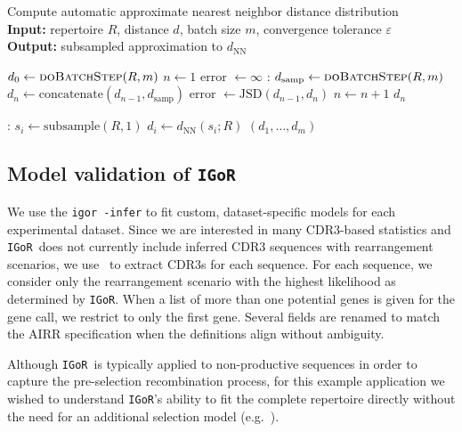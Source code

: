 \documentclass{article}
\newcommand{\igor}{\texttt{IGoR}}
\newcommand{\igblast}{\text{IgBlast}}
\begin{document}
\begin{algorithm}
    \caption{Compute automatic approximate nearest neighbor distance distribution\\
        \textbf{Input:} repertoire $R$, distance $d$, batch size $m$, convergence tolerance $\varepsilon$\\
        \textbf{Output:} subsampled approximation to $d_\text{NN}$}
    \label{alg:NNDistributionAveraging}
    \begin{algorithmic}
        \State $d_0 \gets \Call{doBatchStep}{R, m}$
        \State $n \gets 1$
        \State error $\gets \infty$
        :
        	\State $d_\text{samp} \gets \Call{doBatchStep}{R, m}$
        	\State $d_n \gets \text{concatenate}(d_{n-1}, d_\text{samp})$
        	\State error $\gets \text{JSD}(d_{n-1}, d_n)$
        	\State $n \gets n + 1$
        \EndWhile
            \Return $d_n$
    \end{algorithmic}
    \begin{algorithmic}
    :
		\State $s_i \gets \text{subsample}(R, 1)$
        \State $d_i \gets d_\text{NN}(s_i; R)$
	\EndFor
	\Return $(d_1, \dotsc, d_m)$
	\EndFunction
    \end{algorithmic}
\end{algorithm}

\subsection*{Model validation of \igor}
We use the \texttt{igor -infer} to fit custom, dataset-specific models for each experimental dataset.
Since we are interested in many CDR3-based statistics and \igor\ does not currently include inferred CDR3 sequences with rearrangement scenarios, we use \igblast\ to extract CDR3s for each sequence.
For each sequence, we consider only the rearrangement scenario with the highest likelihood as determined by \igor.
When a list of more than one potential genes is given for the gene call, we restrict to only the first gene.
Several fields are renamed to match the AIRR specification when the definitions align without ambiguity.

Although \igor\ is typically applied to non-productive sequences in order to capture the pre-selection recombination process, for this example application we wished to understand \igor's ability to fit the complete repertoire directly without the need for an additional selection model (e.g.\ \cite{Elhanati2014-mf}).
\end{document}
